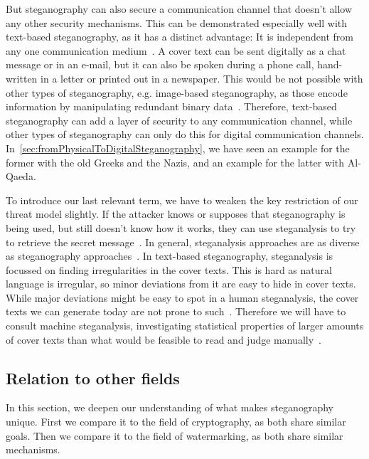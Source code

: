 But steganography can also secure a communication channel that doesn't allow any other security mechanisms. This can be demonstrated especially well with text-based steganography, as it has a distinct advantage: It is independent from any one communication medium~\cite{zieglerNeuralLinguisticSteganography2019}. A cover text can be sent digitally as a chat message or in an e-mail, but it can also be spoken during a phone call, hand-written in a letter or printed out in a newspaper. This would be not possible with other types of steganography, e.g. image-based steganography, as those encode information by manipulating redundant binary data~\cite{bennettLinguisticSteganographySurvey2004}. Therefore, text-based steganography can add a layer of security to any communication channel, while other types of steganography can only do this for digital communication channels. In~\cref{sec:fromPhysicalToDigitalSteganography}, we have seen an example for the former with the old Greeks and the Nazis, and an example for the latter with Al-Qaeda.

To introduce our last relevant term, we have to weaken the key restriction of our threat model slightly. If the attacker knows or supposes that steganography is being used, but still doesn't know how it works, they can use steganalysis to try to retrieve the secret message~\cite{bennettLinguisticSteganographySurvey2004}. In general, steganalysis approaches are as diverse as steganography approaches~\cite{bennettLinguisticSteganographySurvey2004}. In text-based steganography, steganalysis is focussed on finding irregularities in the cover texts. This is hard as natural language is irregular, so minor deviations from it are easy to hide in cover texts. While major deviations might be easy to spot in a human steganalysis, the cover texts we can generate today are not prone to such~\cite{wuGenerativeTextSteganography2024}. Therefore we will have to consult machine steganalysis, investigating statistical properties of larger amounts of cover texts than what would be feasible to read and judge manually~\cite{yangSeSyLinguisticSteganalysis2022,wuGenerativeTextSteganography2024}.

\subsection{Relation to other fields}
\label{sec:relationToOtherFields}
In this section, we deepen our understanding of what makes steganography unique. First we compare it to the field of cryptography, as both share similar goals. Then we compare it to the field of watermarking, as both share similar mechanisms.

